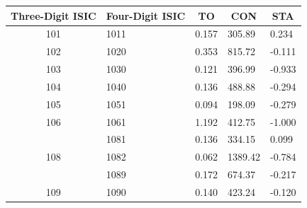 \documentclass[12pt,a4paper]{article}
\begin{document}
{\begin{longtable}{@{}cllll@{}}
	\hline
	\multicolumn{1}{l}{\textbf{Three-Digit   ISIC}} & \multicolumn{1}{c}{\textbf{Four-Digit ISIC}} & \multicolumn{1}{c}{\textbf{TO}} & \multicolumn{1}{c}{\textbf{CON}} & \multicolumn{1}{c}{\textbf{STA}} \\ \hline
	101                                             & 1011                                         & 0.157                           & 305.89                           & 0.234                            \\ \hline
	102                                             & 1020                                         & 0.353                           & 815.72                           & -0.111                           \\ \hline
	103                                             & 1030                                         & 0.121                           & 396.99                           & -0.933                           \\ \hline
	104                                             & 1040                                         & 0.136                           & 488.88                           & -0.294                           \\ \hline
	105                                             & 1051                                         & 0.094                           & 198.09                           & -0.279                           \\ \hline
	106                                             & 1061                                         & 1.192                           & 412.75                           & -1.000                           \\ \hline
	\multirow{3}{*}{108}                            & 1081                                         & 0.136                           & 334.15                           & 0.099                            \\ \cline{2-5} 
	& 1082                                         & 0.062                           & 1389.42                          & -0.784                           \\ \cline{2-5} 
	& 1089                                         & 0.172                           & 674.37                           & -0.217                           \\ \hline
	109                                             & 1090                                         & 0.140                           & 423.24                           & -0.120                           \\ \hline

\end{longtable}}
\end{document}

